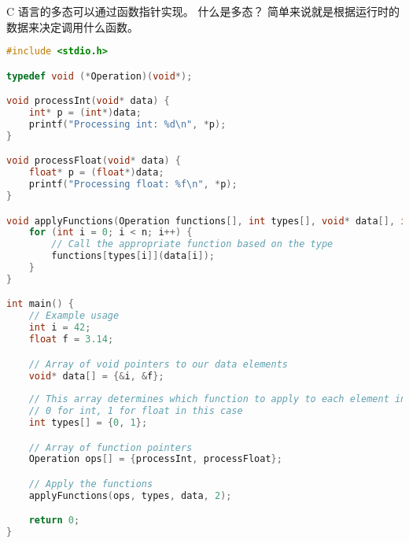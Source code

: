 
C 语言的多态可以通过函数指针实现。 什么是多态？ 简单来说就是根据运行时的数据来决定调用什么函数。

\begin{lstlisting}[language=cpp]
#include <stdio.h>

typedef void (*Operation)(void*);

void processInt(void* data) {
    int* p = (int*)data;
    printf("Processing int: %d\n", *p);
}

void processFloat(void* data) {
    float* p = (float*)data;
    printf("Processing float: %f\n", *p);
}

void applyFunctions(Operation functions[], int types[], void* data[], int n) {
    for (int i = 0; i < n; i++) {
        // Call the appropriate function based on the type
        functions[types[i]](data[i]);
    }
}

int main() {
    // Example usage
    int i = 42;
    float f = 3.14;

    // Array of void pointers to our data elements
    void* data[] = {&i, &f};
    
    // This array determines which function to apply to each element in 'data'
    // 0 for int, 1 for float in this case
    int types[] = {0, 1};

    // Array of function pointers
    Operation ops[] = {processInt, processFloat};

    // Apply the functions
    applyFunctions(ops, types, data, 2);

    return 0;
}
\end{lstlisting}
